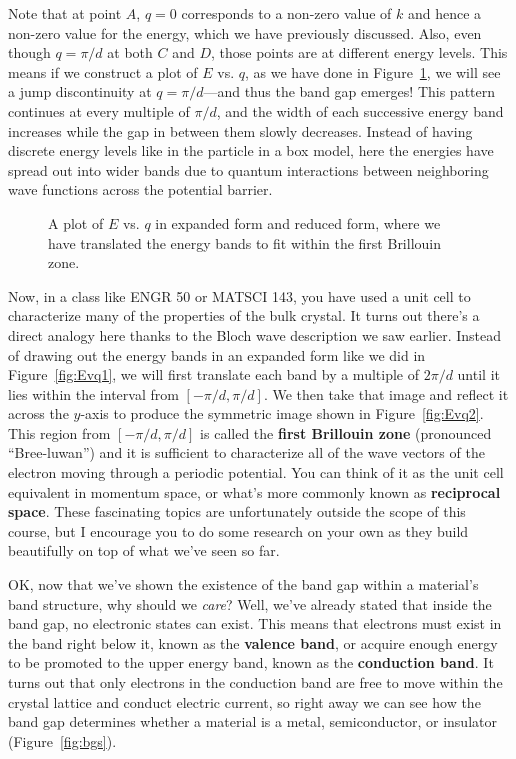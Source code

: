 Note that at point $A$, $q=0$ corresponds to a non-zero value of $k$ and hence a non-zero value for the energy, which we have previously discussed. Also, even though $q=\pi/d$ at both $C$ and $D$, those points are at different energy levels. This means if we construct a plot of $E$ vs. $q$, as we have done in Figure~\ref{fig:Evq}, we will see a jump discontinuity at $q=\pi/d$---and thus the band gap emerges! This pattern continues at every multiple of $\pi/d$, and the width of each successive energy band increases while the gap in between them slowly decreases. Instead of having discrete energy levels like in the particle in a box model, here the energies have spread out into wider bands due to quantum interactions between neighboring wave functions across the potential barrier.

\begin{figure}[!h]
	\centering
	\caption{A plot of $E$ vs. $q$ in \protect{} expanded form and \protect{} reduced form, where we have translated the energy bands to fit within the first Brillouin zone.}
	\label{fig:Evq}
\end{figure}

Now, in a class like ENGR 50 or MATSCI 143, you have used a unit cell to characterize many of the properties of the bulk crystal. It turns out there's a direct analogy here thanks to the Bloch wave description we saw earlier. Instead of drawing out the energy bands in an expanded form like we did in Figure~\ref{fig:Evq1}, we will first translate each band by a multiple of $2\pi/d$ until it lies within the interval from $[-\pi/d, \pi/d]$. We then take that image and reflect it across the $y$-axis to produce the symmetric image shown in Figure~\ref{fig:Evq2}. This region from $[-\pi/d, \pi/d]$ is called the \textbf{first Brillouin zone} (pronounced ``Bree-luwan'') and it is sufficient to characterize all of the wave vectors of the electron moving through a periodic potential. You can think of it as the unit cell equivalent in momentum space, or what's more commonly known as \textbf{reciprocal space}. These fascinating topics are unfortunately outside the scope of this course, but I encourage you to do some research on your own as they build beautifully on top of what we've seen so far. \par 

OK, now that we've shown the existence of the band gap within a material's band structure, why should we \emph{care}? Well, we've already stated that inside the band gap, no electronic states can exist. This means that electrons must exist in the band right below it, known as the \textbf{valence band}, or acquire enough energy to be promoted to the upper energy band, known as the \textbf{conduction band}. It turns out that only electrons in the conduction band are free to move within the crystal lattice and conduct electric current, so right away we can see how the band gap determines whether a material is a metal, semiconductor, or insulator (Figure~\ref{fig:bgs}).

